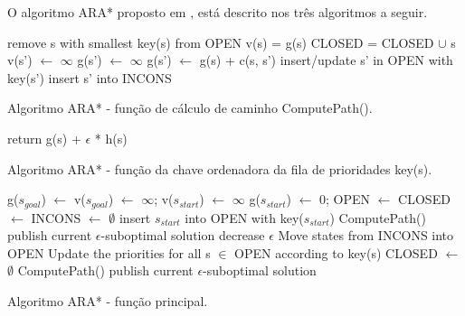 O algoritmo ARA* proposto em , está descrito nos três algoritmos a seguir.

\begin{algorithm}[H]
\SetAlgoLined
{
	remove s with smallest key(s) from OPEN\;
	v(s) = g(s)\; CLOSED = CLOSED $\cup$ {s}\;
	{
		{
			v(s') $\leftarrow$ $\infty$\;
			g(s') $\leftarrow$ $\infty$\;
		}
		{
			g(s') $\leftarrow$ g(s) + c(s, s')\;
			{
				insert/update s' in OPEN with key(s')\;
			}
			{
				insert s' into INCONS\;
			}
		}
	}
}
\caption{Algoritmo ARA* - função de cálculo de caminho ComputePath().}
\end{algorithm}



\begin{algorithm}[H]
\SetAlgoLined
return g(s) + $\epsilon$ * h(s)\;
\caption{Algoritmo ARA* - função da chave ordenadora da fila de prioridades key(s).}
\end{algorithm}

\newpage
\begin{algorithm}[H]
\SetAlgoLined
g($s_{goal}$) $\leftarrow$ v($s_{goal}$) $\leftarrow$ $\infty$; v($s_{start}$) $\leftarrow$ $\infty$\;
g($s_{start}$) $\leftarrow$ 0; OPEN $\leftarrow$ CLOSED $\leftarrow$ INCONS $\leftarrow$ $\emptyset$\;
insert $s_{start}$ into OPEN with key($s_{start}$)\;
ComputePath()\;
publish current $\epsilon$-suboptimal solution\;
{
	decrease $\epsilon$\;
	Move states from INCONS into OPEN\;
	Update the priorities for all s $\in$ OPEN according to key(s)\;
	CLOSED $\leftarrow$ $\emptyset$\;
	ComputePath()\;
	publish current $\epsilon$-suboptimal solution\;
}
\caption{Algoritmo ARA* - função principal.}
\end{algorithm}

